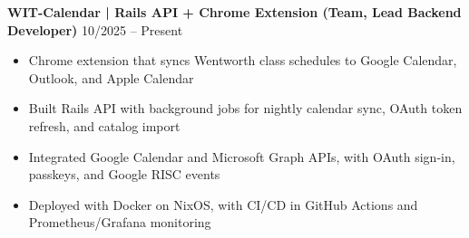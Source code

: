 \noindent
\textbf{WIT-Calendar | Rails API + Chrome Extension (Team, Lead Backend Developer)} \hfill 10/2025 -- Present
\begin{itemize}
    \item Chrome extension that syncs Wentworth class schedules to Google Calendar, Outlook, and Apple Calendar
    \item Built Rails API with background jobs for nightly calendar sync, OAuth token refresh, and catalog import
    \item Integrated Google Calendar and Microsoft Graph APIs, with OAuth sign-in, passkeys, and Google RISC events
    \item Deployed with Docker on NixOS, with CI/CD in GitHub Actions and Prometheus/Grafana monitoring
\end{itemize}
